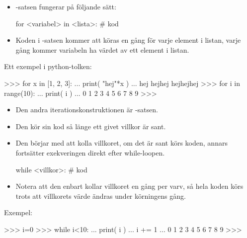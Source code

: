 \documentclass{beamer}
\begin{document}
\begin{frame}[fragile]{\insertsubsectionhead}
  \begin{itemize}
    \item {}-satsen fungerar på följande sätt:
      \begin{src}[language=python]
for <variabel> in <lista>:
   # kod
      \end{src}

    \item Koden i -satsen kommer att köras en gång för varje element 
      i listan, varje gång kommer variabeln ha värdet av ett element i listan.

  \end{itemize}
\end{frame}

\begin{frame}[fragile]{\insertsubsectionhead}
  Ett exempel i python-tolken:
  \begin{terminal}
>>> for x in [1, 2, 3]:
...     print( "hej"*x )
...
hej
hejhej
hejhejhej
>>> for i in range(10):
...     print( i )
...
0 1 2 3 4 5 6 7 8 9
>>>
  \end{terminal}
\end{frame}

\begin{frame}[fragile]{\insertsubsectionhead}
  \begin{itemize}
    \item Den andra iterationskonstruktionen är -satsen.

    \item Den kör sin kod så länge ett givet villkor är sant.

    \item Den börjar med att kolla villkoret, om det är sant körs koden, annars 
      fortsätter exekveringen direkt efter while-loopen.
      \begin{src}[language=python]
while <villkor>:
   # kod
      \end{src}

    \item Notera att den enbart kollar villkoret en gång per varv, så hela 
      koden körs trots att villkorets värde ändras under körningens gång.

  \end{itemize}
\end{frame}

\begin{frame}[fragile]{\insertsubsectionhead}
  Exempel:
  \begin{terminal}
>>> i=0
>>> while i<10:
...     print( i )
...     i += 1
...
0 1 2 3 4 5 6 7 8 9
>>>
  \end{terminal}
\end{frame}
\end{document}

